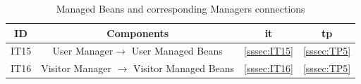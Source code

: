 \begin{table}[htbp]
\begin{center}
\begin{tabular}[t]{cccc}

\hline
\textbf{ID} & \textbf{Components} & \textbf{\acs{it}} & \textbf{\acs{tp}}\\
\hline
IT15 & \enspace User  Manager$\rightarrow$ User Managed Beans \enspace & \ref{sssec:IT15} & \ref{sssec:TP5}\\
\hline
IT16 & \enspace Visitor Manager $\rightarrow$ Visitor Managed Beans \enspace & \ref{sssec:IT16} & \ref{sssec:TP5}\\
\hline

\end{tabular}
\caption{Managed Beans and corresponding Managers connections}
\end{center}
\end{table}

\clearpage